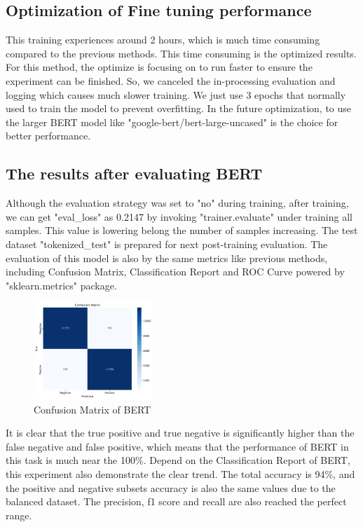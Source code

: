 \subsection{Optimization of Fine tuning performance}
This training experiences around 2 hours, which is much time consuming compared to the previous methods. This time consuming is the optimized results. For this method, the optimize is focusing on to run faster to ensure the experiment can be finished. So, we canceled the in-processing evaluation and logging which causes much slower training. We just use 3 epochs that normally used to train the model to prevent overfitting. In the future optimization, to use the larger BERT model like "google-bert/bert-large-uncased" is the choice for better performance. 

\subsection{The results after evaluating BERT}

Although the evaluation strategy was set to "no" during training, after training, we can get "eval\_loss" as 0.2147 by invoking "trainer.evaluate" under training all samples. This value is lowering belong the number of samples increasing. The test dataset "tokenized\_test" is prepared for next post-training evaluation. The evaluation of this model is also by the same metrics like previous methods, including Confusion Matrix, Classification Report and ROC Curve powered by "sklearn.metrics" package.

\begin{figure}[ht]
    \centering
    \includegraphics[width=0.4\textwidth]{pics/bert_matrix.png}
    \caption{Confusion Matrix of BERT}
\end{figure}

It is clear that the true positive and true negative is significantly higher than the false negative and false positive, which means that the performance of BERT in this task is much near the 100\%. Depend on the Classification Report of BERT, this experiment also demonstrate the clear trend. The total accuracy is 94\%, and the positive and negative subsets accuracy is also the same values due to the balanced dataset. The precision, f1 score and recall are also reached the perfect range.

